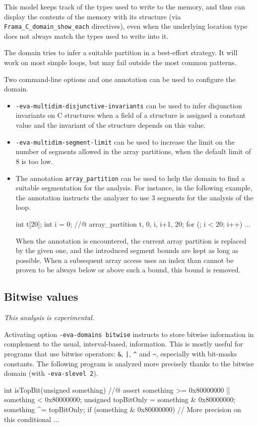 \documentclass{frama-c-book}
\begin{document}
This model keeps track of the types used to write to the memory, and thus
can display the contents of the memory with its structure (via
\lstinline|Frama_C_domain_show_each| directives), even when the underlying
location type does not always match the types used to write into it.

The domain tries to infer a suitable partition in a best-effort strategy. It
will work on most simple loops, but may fail outside the most common patterns.

Two command-line options and one annotation can be used to configure the
domain.
\begin{itemize}
  \item {\tt -eva-multidim-disjunctive-invariants} can be used to infer
        disjunction invariants on C structures when a field of a structure is
        assigned a constant value and the invariant of the structure depends on
        this value.
  \item {\tt -eva-multidim-segment-limit} can be used to increase the limit on
        the number of segments allowed in the array partitions, when the default
        limit of 8 is too low.
  \item The annotation {\tt array\_partition} can be used to help the domain
        to find a suitable segmentation for the analysis. For instance, in
        the following example, the annotation instructs the analyzer to use
        3 segments for the analysis of the loop.
\begin{listing-nonumber}
int t[20];
int i = 0;
//@ array_partition t, 0, i, i+1, 20;
for (; i < 20; i++) {
  ...
}
\end{listing-nonumber}
        When the annotation is encountered, the current array partition is
        replaced by the given one, and the introduced segment bounds are kept
        as long as possible. When a subsequent array access uses an index than
        cannot be proven to be always below or above such a bound, this
        bound is removed.
\end{itemize}


\subsection{Bitwise values}
\label{sec:bitwise}

\emph{This analysis is experimental.}

Activating option \texttt{-eva-domains bitwise} instructs \Eva{} to store
bitwise information in complement to the usual, interval-based, information.
This is mostly useful for programs that use bitwise operators: \verb+&+,
\verb+|+, \verb+^+ and \verb+~+, especially with bit-masks constants.
The following program is analyzed more precisely thanks to the bitwise
domain (with \lstinline+-eva-slevel 2+).
\begin{listing-nonumber}
int isTopBit(unsigned something)
{
  //@ assert something >= 0x80000000 || something < 0x80000000;
  unsigned topBitOnly = something & 0x80000000;
  something ^= topBitOnly;
  if (something & 0x80000000) // More precision on this conditional { ... }
}
\end{listing-nonumber}
\end{document}
